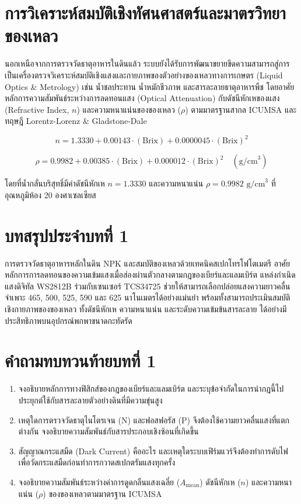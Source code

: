 \section{การวิเคราะห์สมบัติเชิงทัศนศาสตร์และมาตรวิทยาของเหลว}
นอกเหนือจากการตรวจวัดธาตุอาหารในดินแล้ว ระบบยังได้รับการพัฒนาขยายขีดความสามารถสู่การเป็นเครื่องตรวจวิเคราะห์สมบัติเชิงแสงและกายภาพของตัวอย่างของเหลวทางการเกษตร (Liquid Optics \& Metrology) เช่น น้ำชลประทาน น้ำหมักชีวภาพ และสารละลายธาตุอาหารพืช โดยอาศัยหลักการความสัมพันธ์ระหว่างการลดทอนแสง (Optical Attenuation) กับดัชนีหักเหของแสง (Refractive Index, $n$) และความหนาแน่นของของเหลว ($\rho$) ตามมาตรฐานสากล ICUMSA และทฤษฎี Lorentz-Lorenz \& Gladstone-Dale

\begin{equation}
    n = 1.3330 + 0.00143 \cdot (\text{Brix}) + 0.0000045 \cdot (\text{Brix})^2
\end{equation}

\begin{equation}
    \rho = 0.9982 + 0.00385 \cdot (\text{Brix}) + 0.000012 \cdot (\text{Brix})^2 \quad (\text{g/cm}^3)
\end{equation}

โดยที่น้ำกลั่นบริสุทธิ์มีค่าดัชนีหักเห $n = 1.3330$ และความหนาแน่น $\rho = 0.9982\text{ g/cm}^3$ ที่อุณหภูมิห้อง 20 องศาเซลเซียส

\section*{บทสรุปประจำบทที่ 1}
การตรวจวัดธาตุอาหารหลักในดิน NPK และสมบัติของเหลวด้วยเทคนิคสเปกโทรโฟโตเมตรี อาศัยหลักการการลดทอนของความเข้มแสงเมื่อส่องผ่านตัวกลางตามกฎของเบียร์และแลมเบิร์ต แหล่งกำเนิดแสงดิจิทัล WS2812B ร่วมกับเซนเซอร์ TCS34725 ช่วยให้สามารถเลือกปล่อยแสงความยาวคลื่นจำเพาะ 465, 500, 525, 590 และ 625 นาโนเมตรได้อย่างแม่นยำ พร้อมทั้งสามารถประเมินสมบัติเชิงกายภาพของของเหลว ทั้งดัชนีหักเห ความหนาแน่น และระดับความเข้มข้นสารละลาย ได้อย่างมีประสิทธิภาพบนอุปกรณ์พกพาขนาดกะทัดรัด

\section*{คำถามทบทวนท้ายบทที่ 1}
\begin{enumerate}[leftmargin=1.5em, itemsep=3pt]
    \item จงอธิบายหลักการทางฟิสิกส์ของกฎของเบียร์และแลมเบิร์ต และระบุข้อจำกัดในการนำกฎนี้ไปประยุกต์ใช้กับสารละลายตัวอย่างดินที่มีความขุ่นสูง
    \item เหตุใดการตรวจวัดธาตุไนโตรเจน (N) และฟอสฟอรัส (P) จึงต้องใช้ความยาวคลื่นแสงที่แตกต่างกัน จงอธิบายความสัมพันธ์กับสารประกอบเชิงซ้อนที่เกิดขึ้น
    \item สัญญาณกระแสมืด (Dark Current) คืออะไร และเหตุใดระบบเฟิร์มแวร์จึงต้องทำการดับไฟเพื่อวัดกระแสมืดก่อนทำการกวาดสเปกตรัมแสงทุกครั้ง
    \item จงอธิบายความสัมพันธ์ระหว่างค่าการดูดกลืนแสงเฉลี่ย ($A_{\text{mean}}$) ดัชนีหักเห ($n$) และความหนาแน่น ($\rho$) ของของเหลวตามมาตรฐาน ICUMSA
\end{enumerate}
